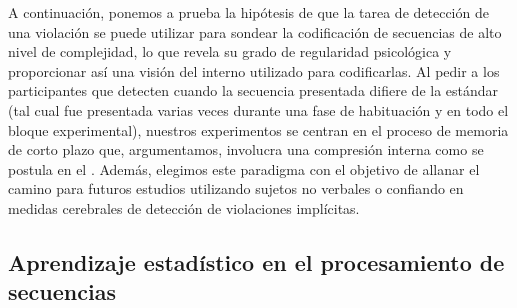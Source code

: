 A continuación, ponemos a prueba la hipótesis de que la tarea de detección de una violación se puede utilizar para sondear la codificación de secuencias de alto nivel de complejidad, lo que revela su grado de regularidad psicológica y proporcionar así una visión del \lot interno utilizado para codificarlas. Al pedir a los participantes que detecten cuando la secuencia presentada difiere de la estándar (tal cual fue presentada varias veces durante una fase de habituación y en todo el bloque experimental), nuestros experimentos se centran en el proceso de memoria de corto plazo que, argumentamos, involucra una compresión interna como se postula en el \lot. Además, elegimos este paradigma con el objetivo de allanar el camino para futuros estudios utilizando sujetos no verbales o confiando en medidas cerebrales de detección de violaciones implícitas.

\subsection{Aprendizaje estadístico en el procesamiento de secuencias}


